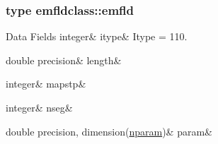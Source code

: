 \subsubsection{type emfldclass\+::emfld}
\begin{DoxyFields}{Data Fields}
\mbox{\label{namespaceemfldclass_aa9a88075072a030b64fd3878793b499b}} 
integer&
itype&
Itype = 110. \\
\hline

\mbox{\label{namespaceemfldclass_a4938896636fb9fa907f15b621831cf97}} 
double precision&
length&
\\
\hline

\mbox{\label{namespaceemfldclass_ac18dfbe320fc1dc13393780eb0ae2613}} 
integer&
mapstp&
\\
\hline

\mbox{\label{namespaceemfldclass_a35f0c51ff70d545cef92bbbfa9546006}} 
integer&
nseg&
\\
\hline

\mbox{\label{namespaceemfldclass_ac4480d690e4e4d88d88ba939af8213cd}} 
double precision, dimension(\mbox{\hyperlink{namespaceemfldclass_ad6fed90f4153b92a9a9ff35a6ef146c3}{nparam}})&
param&
\\
\hline

\end{DoxyFields}
